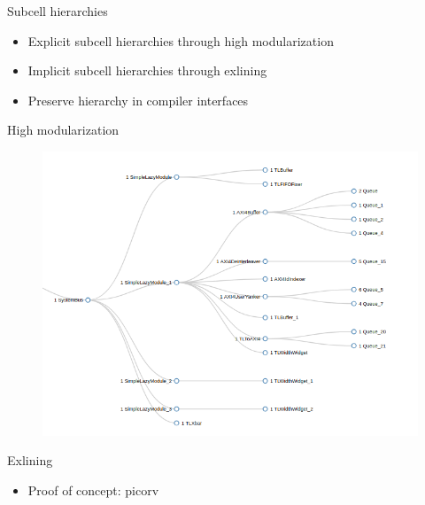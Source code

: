 \documentclass[aspectratio=169]{beamer}
\begin{document}
\begin{frame}{Subcell hierarchies}
	\begin{itemize}
        \setlength\itemsep{1em}
		\item Explicit subcell hierarchies through high modularization
		\item Implicit subcell hierarchies through exlining
		\item Preserve hierarchy in compiler interfaces
	\end{itemize}
\end{frame}

\begin{frame}{High modularization}
        \begin{figure}
        \centering
        \includegraphics[scale=0.42]{images/SystemBus.png}
        \end{figure}
        \begin{center}
            \href{url}{}
        \end{center}
\end{frame}

\begin{frame}{Exlining}
	\begin{itemize}
        \setlength\itemsep{1em}
		\item Proof of concept: picorv
	\end{itemize}
        \begin{center}
            \href{url}{}
        \end{center}
\end{frame}
\end{document}

